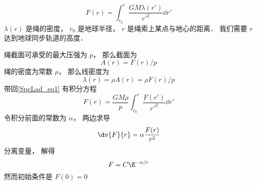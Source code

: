 
\begin{equation}\label{SpcLad_eq1}
F(r) = \int_{r_0}^{r} \frac{GM\lambda(r')}{r'^2} \dd{r'}
\end{equation}
$\lambda(r)$ 是绳的密度， $r_0$ 是地球半径， $r$ 是绳索上某点与地心的距离． 我们需要 $r$ 达到地球同步轨道的高度．

绳截面可承受的最大压强为 $p$， 那么截面为
\begin{equation}
A(r) = F(r)/p
\end{equation}
绳的密度为常数 $\rho$， 那么线密度为
\begin{equation}
\lambda(r) = \rho A(r) = \rho F(r)/p
\end{equation}
带回\autoref{SpcLad_eq1} 有积分方程
\begin{equation}
F(r) = \frac{GM\rho}{p} \int_{r_0}^{r} \frac{F(r')}{r'^2} \dd{r'}
\end{equation}
令积分前面的常数为 $\alpha$， 两边求导
\begin{equation}
\dv{F}{r} = \alpha \frac{F(r)}{r^2}
\end{equation}
分离变量， 解得
\begin{equation}
F = C\E^{-\alpha/r}
\end{equation}
然而初始条件是 $F(0) = 0$
